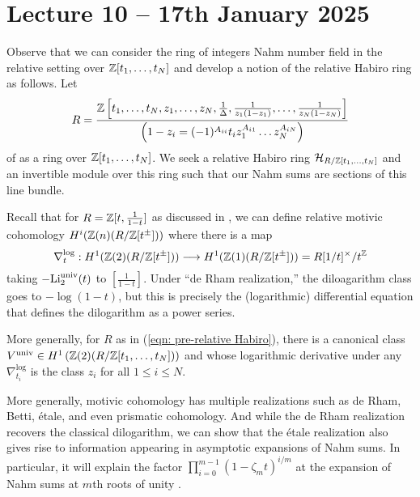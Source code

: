 \section{Lecture 10 -- 17th January 2025}\label{sec: lecture 10}
Observe that we can consider the ring of integers Nahm number field in the relative setting over $\mathbb{Z}[t_{1},\dots,t_{N}]$ and develop a notion of the relative Habiro ring as follows. Let
\begin{equation}\label{eqn: pre-relative Habiro}
    R=\frac{\mathbb{Z}\left[t_{1},\dots,t_{N},z_{1},\dots,z_{N}, \frac{1}{\Delta},\frac{1}{z_{1}(1-z_{1})},\dots,\frac{1}{z_{N}(1-z_{N})}\right]}{\left(1-z_{i}=(-1)^{A_{ii}}t_{i}z_{1}^{A_{i1}}\dots z_{N}^{A_{iN}}\right)}
\end{equation}
of  as a ring over $\mathbb{Z}[t_{1},\dots,t_{N}]$. We seek a relative Habiro ring $\mathcal{H}_{R/\mathbb{Z}[t_{1},\dots,t_{N}]}$ and an invertible module over this ring such that our Nahm sums are sections of this line bundle. 

Recall that for $R=\mathbb{Z}[t,\frac{1}{1-t}]$ as discussed in , we can define relative motivic cohomology $H^{i}(\mathbb{Z}(n)(R/\mathbb{Z}[t^{\pm}]))$ where there is a map 
$$\nabla^{\log}_{t}:H^{1}(\mathbb{Z}(2)(R/\mathbb{Z}[t^{\pm}]))\longrightarrow H^{1}(\mathbb{Z}(1)(R/\mathbb{Z}[t^{\pm}]))=R[1/t]^{\times}/t^{\mathbb{Z}}$$
taking $-\mathrm{Li}^{\mathrm{univ}}_{2}(t)$ to $[\frac{1}{1-t}]$. Under ``de Rham realization,'' the diloagarithm class goes to $-\log(1-t)$, but this is precisely the (logarithmic) differential equation that defines the dilogarithm as a power series. 
\begin{remark}
    More generally, for $R$ as in (\ref{eqn: pre-relative Habiro}), there is a canonical class $V^{\mathrm{univ}}\in H^{1}\left(\mathbb{Z}(2)(R/\mathbb{Z}[t_{1},\dots,t_{N}])\right)$ and whose logarithmic derivative under any $\nabla^{\log}_{t_{i}}$ is the class $z_{i}$ for all $1\leq i\leq N$. 
\end{remark}

More generally, motivic cohomology has multiple realizations such as de Rham, Betti, \'{e}tale, and even prismatic cohomology. And while the de Rham realization recovers the classical dilogarithm, we can show that the \'{e}tale realization also gives rise to information appearing in asymptotic expansions of Nahm sums. In particular, it will explain the factor $\prod_{i=0}^{m-1}(1-\zeta_{m}t)^{i/m}$ at the expansion of Nahm sums at $m$th roots of unity .

